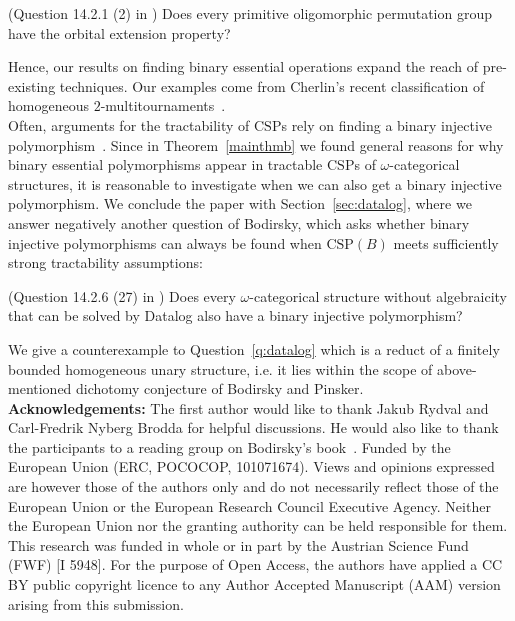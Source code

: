 \documentclass{article}
\theoremstyle{remark}
\theoremstyle{definition}
\newenvironment{customq}[1]
  {\renewcommand\theinnercustomq{#1}\innercustomq}
  {\endinnercustomq}
\begin{document}
\begin{customq}{2}(Question 14.2.1 (2) in {\cite{BodCSP}})\label{qOEP}
    Does every primitive oligomorphic permutation group have the orbital extension property?
\end{customq}

 Hence, our results on finding binary essential operations expand the reach of pre-existing techniques. Our examples come from Cherlin's recent classification of homogeneous $2$-multitournaments~\cite{Cherlinclass}.\\

Often, arguments for the tractability of $\mathrm{CSP}$s rely on finding a binary injective polymorphism~\cite{BodKara, bodirsky2010complexity, minrandom, Smoothapp, bodirsky2020complexity}. Since in Theorem~\ref{mainthmb} we found general reasons for why binary essential polymorphisms appear in tractable $\mathrm{CSP}$s of $\omega$-categorical structures, it is reasonable to investigate when we can also get a binary injective polymorphism. We conclude the paper with Section~\ref{sec:datalog}, where we answer negatively another question of Bodirsky, which asks whether binary injective polymorphisms can always be found when $\mathrm{CSP}(B)$ meets sufficiently strong tractability assumptions:

\begin{customq}{3}(Question 14.2.6 (27)  in {\cite{BodCSP}})\label{q:datalog}
    Does every $\omega$-categorical structure without algebraicity that can be solved
by Datalog also have a binary injective polymorphism?
\end{customq}

We give a counterexample to Question~\ref{q:datalog} which is a reduct of a finitely bounded homogeneous unary structure, i.e. it lies within the scope of above-mentioned dichotomy conjecture of Bodirsky and Pinsker. \\ 

\textbf{Acknowledgements:} The first author would like to thank Jakub Rydval and Carl-Fredrik Nyberg Brodda for helpful discussions. He would also like to thank the participants to a reading group on Bodirsky's book~\cite{BodCSP}. Funded by the European Union (ERC, POCOCOP, 101071674). Views and opinions expressed are however those of the authors only and do not necessarily reflect those of the European Union or the European Research Council Executive Agency. Neither the European Union nor the granting authority can be held responsible for them. 
This research was funded in whole or in part by the Austrian Science Fund (FWF) [I 5948]. For the purpose
of Open Access, the authors have applied a CC BY public copyright licence to any Author Accepted Manuscript (AAM) version arising from this submission.
\end{document}
